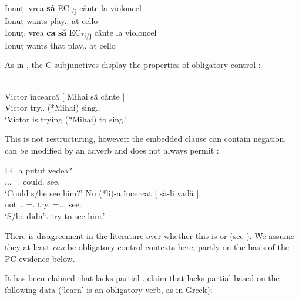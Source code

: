 \documentclass[output=paper]{langsci/langscibook}
\begin{document}
\ea%
    \label{ex:24.23}
	\ea
		\gll Ionuț\textsubscript{i} vrea     \textbf{sǎ} EC\textsubscript{i/j} cânte     la violoncel\\
        Ionuț  wants     \Sbjv{}   {}  play.\Sbjv{}.\Tsg{}  at cello\\
	\ex	\gll Ionuț\textsubscript{i}  vrea   \textbf{ca} \textbf{sǎ}   EC\textsubscript{*i/j} cânte     la violoncel\\
        Ionuț  wants   that   \Sbjv{}  {}   play.\Sbjv{}.\Tsg{}  at cello\\
	\z
\z

As in , the C-subjunctives display the properties of obligatory
control
\parencite{Landau2004,Alboiu2007,AlexiadouEtAl2010,Hill2012,Nicolae2013}:

\ea%
    \label{ex:24.24}\\
	\gll \llap{*}Victor încearcă     [ Mihai     să   cânte ]\\
        Victor try.\Prs.\Tsg{} {} (*Mihai) \Sbjv{} sing.\Sbjv.\Tsg{}\\
    \glt ‘Victor is trying (*Mihai) to sing.’
\z

This is not restructuring, however: the embedded clause can contain negation,
can be modified by an adverb and does not always permit 
\parencite{Alboiu2007,AlexiadouEtAl2010}:

\ea%
    \label{ex:24.25} \citep[8]{Alboiu2007}
	\ea
		\gll Li=a         putut     vedea?\\
        \Cl{}.\Tsg.\M.\Acc{}=\Aux.\Tsg{}   could.\Ptcp{}   see.\Tsg{}\\
		\glt ‘Could s/he see him?’
	\ex
		\gll Nu (*li)-a             încercat    [ să-li       vadă ].\\
        not \hphantom{(*}\Cl.\Tsg.\M.\Acc{}=\Aux.\Tsg{} try.\Ptcp{} {} \Sbjv=\Cl.\Tsg.\M.\Acc{} see.\Tsg\\
		\glt ‘S/he didn’t try to see him.’
	\z
\z

There is disagreement in the literature over whether this is  or 
(see \citealt{Nicolae2013}). We assume they at least \emph{can} be obligatory
control contexts here, partly on the basis of the \gls{PC} evidence below.

It has been claimed that  lacks partial .
\citet{AlexiadouEtAl2010} claim that  lacks partial  based on
the following data (‘learn’ is an obligatory  verb, as in Greek):
\end{document}
